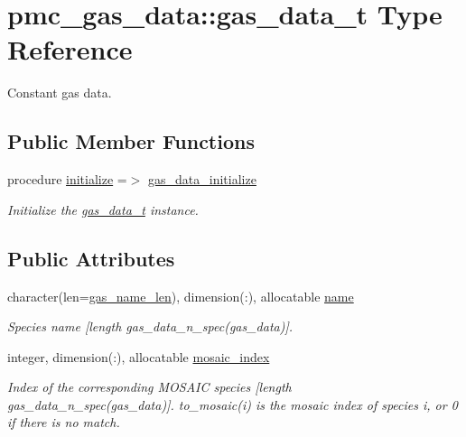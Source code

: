 \hypertarget{structpmc__gas__data_1_1gas__data__t}{}\section{pmc\+\_\+gas\+\_\+data\+:\+:gas\+\_\+data\+\_\+t Type Reference}
\label{structpmc__gas__data_1_1gas__data__t}


Constant gas data.  


\subsection*{Public Member Functions}
\begin{DoxyCompactItemize}
\item 
procedure \mbox{\hyperlink{structpmc__gas__data_1_1gas__data__t_ab2516df3d61303f31721437a49f3e844}{initialize}} =$>$ \mbox{\hyperlink{namespacepmc__gas__data_af46c599614532ddd2e6741a0a7bed14e}{gas\+\_\+data\+\_\+initialize}}
\begin{DoxyCompactList}\small\item\em Initialize the \mbox{\hyperlink{structpmc__gas__data_1_1gas__data__t}{gas\+\_\+data\+\_\+t}} instance. \end{DoxyCompactList}\end{DoxyCompactItemize}
\subsection*{Public Attributes}
\begin{DoxyCompactItemize}
\item 
character(len=\mbox{\hyperlink{namespacepmc__gas__data_a0d310b1185398e90f841bb9c3c83d3a9}{gas\+\_\+name\+\_\+len}}), dimension(\+:), allocatable \mbox{\hyperlink{structpmc__gas__data_1_1gas__data__t_aebf4763c4d3619032de66b4bfcb7a3a2}{name}}
\begin{DoxyCompactList}\small\item\em Species name \mbox{[}length {\ttfamily gas\+\_\+data\+\_\+n\+\_\+spec(gas\+\_\+data)}\mbox{]}. \end{DoxyCompactList}\item 
integer, dimension(\+:), allocatable \mbox{\hyperlink{structpmc__gas__data_1_1gas__data__t_a966d877df13fc1f0bc63e9c8b66dd2f5}{mosaic\+\_\+index}}
\begin{DoxyCompactList}\small\item\em Index of the corresponding M\+O\+S\+A\+IC species \mbox{[}length {\ttfamily gas\+\_\+data\+\_\+n\+\_\+spec(gas\+\_\+data)}\mbox{]}. {\ttfamily to\+\_\+mosaic(i)} is the mosaic index of species {\ttfamily i}, or 0 if there is no match. \end{DoxyCompactList}\end{DoxyCompactItemize}


